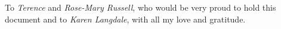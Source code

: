 
\begin{dedication}
To \emph{Terence} and \emph{Rose-Mary Russell}, who would be very proud to hold this document and to \emph{Karen Langdale}, with all my love and gratitude.
\end{dedication}
